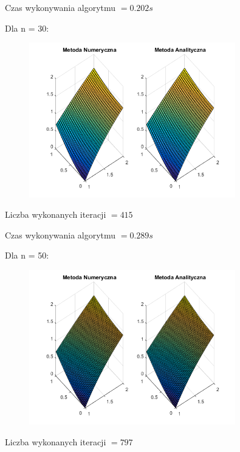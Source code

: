 Czas wykonywania algorytmu $ = 0.202 s$

Dla n = 30:

\begin{figure}[!ht]
	\begin{center}
		\includegraphics[width=0.8\textwidth]{Lab6/charts/jacobi/zad1/30.png}
	\end{center}
\end{figure}

Liczba wykonanych iteracji $ = 415 $

Czas wykonywania algorytmu $ = 0.289 s$

\newpage

Dla n = 50:

\begin{figure}[!ht]
	\begin{center}
		\includegraphics[width=0.8\textwidth]{Lab6/charts/jacobi/zad1/50.png}
	\end{center}
\end{figure}

Liczba wykonanych iteracji $ = 797 $

